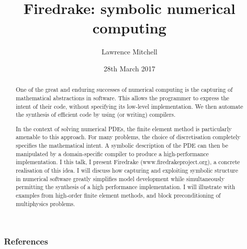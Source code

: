 \documentclass[presentation]{beamer}
\date{28th March 2017}
\author{Lawrence Mitchell\inst{1,*}}
\institute{
\inst{1}Departments of Computing and Mathematics, Imperial College
London

\inst{*}\texttt{lawrence.mitchell@imperial.ac.uk}
}
\title{Firedrake: symbolic numerical computing}
\begin{document}
\maketitle

\begin{abstract}
  One of the great and enduring successes of numerical computing is
  the capturing of mathematical abstractions in software.  This allows
  the programmer to express the intent of their code, without
  specifying its low-level implementation.  We then automate the
  synthesis of efficient code by using (or writing) compilers.

  In the context of solving numerical PDEs, the finite element method
  is particularly amenable to this approach.  For many problems, the
  choice of discretisation completely specifies the mathematical
  intent.  A symbolic description of the PDE can then be manipulated
  by a domain-specific compiler to produce a high-performance
  implementation.  I this talk, I present Firedrake
  (www.firedrakeproject.org), a concrete realisation of this idea.  I
  will discuss how capturing and exploiting symbolic structure in
  numerical software greatly simplifies model development while
  simultaneously permitting the synthesis of a high performance
  implementation.  I will illustrate with examples from high-order
  finite element methods, and block preconditioning of multiphysics
  problems.
\end{abstract}

\appendix
\begin{frame}[t,allowframebreaks]
  \frametitle{References}
  \printbibliography[heading=none]
\end{frame}
\end{document}
